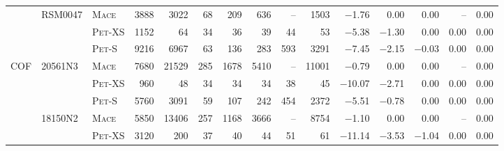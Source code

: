 \begin{tabular}{lllr rrrrrr rrrrr}
\addlinespace
                  &           RSM0047  &     \textsc{Mace}  &        \num{3888}  &        \num{3022}  &          \num{68}  &         \num{209}  &         \num{636}  &                --  &        \num{1503}  &       \num{-1.76}  &        \num{0.00}  &        \num{0.00}  &                --  &        \num{0.00} \\ 
                  &                    &   \textsc{Pet}-XS  &        \num{1152}  &          \num{64}  &          \num{34}  &          \num{36}  &          \num{39}  &          \num{44}  &          \num{53}  &       \num{-5.38}  &       \num{-1.30}  &        \num{0.00}  &        \num{0.00}  &        \num{0.00} \\ 
                  &                    &    \textsc{Pet}-S  &        \num{9216}  &        \num{6967}  &          \num{63}  &         \num{136}  &         \num{283}  &         \num{593}  &        \num{3291}  &       \num{-7.45}  &       \num{-2.15}  &       \num{-0.03}  &        \num{0.00}  &        \num{0.00} \\ 
\midrule
             COF  &           20561N3  &     \textsc{Mace}  &        \num{7680}  &       \num{21529}  &         \num{285}  &        \num{1678}  &        \num{5410}  &                --  &       \num{11001}  &       \num{-0.79}  &        \num{0.00}  &        \num{0.00}  &                --  &        \num{0.00} \\ 
                  &                    &   \textsc{Pet}-XS  &         \num{960}  &          \num{48}  &          \num{34}  &          \num{34}  &          \num{34}  &          \num{38}  &          \num{45}  &      \num{-10.07}  &       \num{-2.71}  &        \num{0.00}  &        \num{0.00}  &        \num{0.00} \\ 
                  &                    &    \textsc{Pet}-S  &        \num{5760}  &        \num{3091}  &          \num{59}  &         \num{107}  &         \num{242}  &         \num{454}  &        \num{2372}  &       \num{-5.51}  &       \num{-0.78}  &        \num{0.00}  &        \num{0.00}  &        \num{0.00} \\ 
\addlinespace
                  &           18150N2  &     \textsc{Mace}  &        \num{5850}  &       \num{13406}  &         \num{257}  &        \num{1168}  &        \num{3666}  &                --  &        \num{8754}  &       \num{-1.10}  &        \num{0.00}  &        \num{0.00}  &                --  &        \num{0.00} \\ 
                  &                    &   \textsc{Pet}-XS  &        \num{3120}  &         \num{200}  &          \num{37}  &          \num{40}  &          \num{44}  &          \num{51}  &          \num{61}  &      \num{-11.14}  &       \num{-3.53}  &       \num{-1.04}  &        \num{0.00}  &        \num{0.00} \\ 

\end{tabular}
